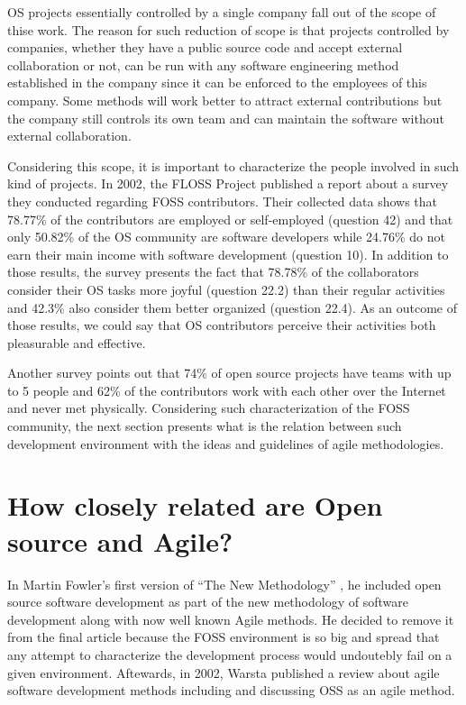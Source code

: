 \documentclass[lnbip]{svmultln}
\begin{document}
OS projects essentially controlled by a single company fall out of the
scope of thise work. The reason for such reduction of scope is that
projects controlled by companies, whether they have a public source
code and accept external collaboration or not, can be run with any
software engineering method established in the company since it can be
enforced to the employees of this company. Some methods will work
better to attract external contributions but the company still
controls its own team and can maintain the software without external
collaboration.

Considering this scope, it is important to characterize the people
involved in such kind of projects. In 2002, the FLOSS Project
\cite{url:flossproject} published a report about a survey they
conducted regarding FOSS contributors. Their collected data
\cite{url:flossdata} shows that 78.77\% of the contributors are
employed or self-employed (question 42) and that only 50.82\% of the
OS community are software developers while 24.76\% do not earn their
main income with software development (question 10).  In addition to
those results, the survey presents the fact that 78.78\% of the
collaborators consider their OS tasks more joyful (question 22.2) than
their regular activities and 42.3\% also consider them better
organized (question 22.4). As an outcome of those results, we could
say that OS contributors perceive their activities both pleasurable
and effective.


Another survey \cite{reis2003} points out that 74\% of open source
projects have teams with up to 5 people and 62\% of the contributors
work with each other over the Internet and never met
physically. Considering such characterization of the FOSS community,
the next section presents what is the relation between such
development environment with the ideas and guidelines of agile
methodologies.

\section{How closely related are Open source and Agile?}
\label{sec:relation}

In Martin Fowler's first version of ``The New Methodology''
\cite{url:fowler2000orig}, he included open source software
development as part of the new methodology of software development
along with now well known Agile methods. He decided to remove it from
the final article because the FOSS environment is so big and spread
that any attempt to characterize the development process would
undoutebly fail on a given environment. Aftewards, in 2002, Warsta
\cite{warsta2002} published a review about agile software development
methods including and discussing OSS as an agile method.
\end{document}
